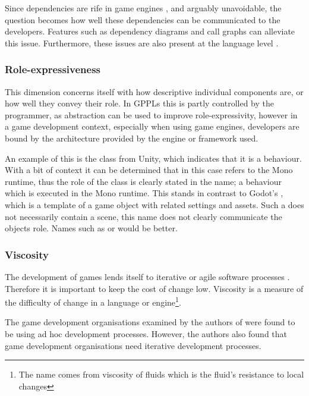 Since dependencies are rife in game engines \cite{blow2004game}, and arguably unavoidable, the question becomes how well these dependencies can be communicated to the developers. Features such as dependency diagrams and call graphs can alleviate this issue. Furthermore, these issues are also present at the language level \cite{kiczales1997aspect, green1996usability}.

\subsubsection{Role-expressiveness}
This dimension concerns itself with how descriptive individual components are, or how well they convey their role. In \acp{GPPL} this is partly controlled by the programmer, as abstraction can be used to improve role-expressivity, however in a game development context, especially when using game engines, developers are bound by the architecture provided by the engine or framework used.

An example of this is the  class from Unity, which indicates that it is a behaviour. With a bit of context it can be determined that  in this case refers to the Mono runtime, thus the role of the class is clearly stated in the name; a behaviour which is executed in the Mono runtime. This stands in contrast to Godot's , which is a template of a game object with related settings and assets. Such a  does not necessarily contain a scene, this name does not clearly communicate the objects role. Names such as  or  would be better. 

\subsubsection{Viscosity}
The development of games lends itself to iterative or agile software processes \cite{petrillo2010agility}. Therefore it is important to keep the cost of change low. Viscosity is a measure of the difficulty of change in a language or engine\footnote{The name comes from viscosity of fluids which is the fluid's resistance to local changes}.

The game development organisations examined by the authors of \cite{kasurinen2013applicable} were found to be using ad hoc development processes. However, the authors also found that game development organisations need iterative development processes.

